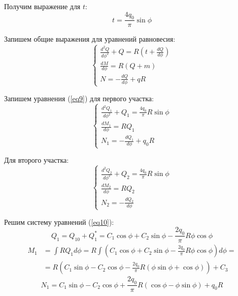 Получим выражение для $t$:
\begin{equation}
    \label{eq8}
    t = \frac{4q_0}{\pi} \sin \phi
\end{equation}

Запишем общие выражения для уравнений равновесия:
\begin{equation}
    \label{eq9}
    \begin{cases}
        \displaystyle \frac{d^2 Q}{d \phi^2} + Q = R(t + \frac{dQ}{d \phi})
        \\[10pt]
        \displaystyle \frac{dM}{d \phi} = R(Q + m)
        \\[10pt]
        \displaystyle N = -\frac{dQ}{d \phi} + qR
    \end{cases}
\end{equation}

Запишем уравнения (\ref{eq9}) для первого участка:
\begin{equation}
    \label{eq10}
    \begin{cases}
        \displaystyle \frac{d^2 Q_1}{d \phi^2} + Q_1 = \frac{4q_0}{\pi} R \sin \phi
        \\[10pt]
        \displaystyle \frac{dM_1}{d \phi} = RQ_1
        \\[10pt]
        \displaystyle N_1 = - \frac{dQ_1}{d \phi} + q_0R
    \end{cases}
\end{equation} 

Для второго участка:
\begin{equation}
    \label{eq11}
    \begin{cases}
        \displaystyle \frac{d^2Q_2}{d \phi^2} + Q_2 = \frac{4q_0}{\pi} R \sin \phi
        \\[10pt]
        \displaystyle \frac{dM_2}{d \phi} = RQ_2
        \\[10pt]
        \displaystyle N_2 = - \frac{dQ_2}{d \phi}
    \end{cases}
\end{equation}

Решим систему уравнений (\ref{eq10}):
\begin{equation}
    \label{eq12}
    Q_1 = Q_{10} + Q_1^* = C_1 \cos \phi + C_2 \sin \phi - \frac{2q_0}{\pi} R\phi \cos \phi
\end{equation}
\begin{equation}
    \label{eq13}
    \begin{split}
        M_1 & = \int{RQ_1 d \phi} = R \int{(C_1 \cos \phi + C_2 \sin \phi - \frac{2q_0}{\pi}R \phi \cos \phi) d \phi} =
        \\
        & = R (C_1 \sin \phi - C_2 \cos \phi - \frac{2q_0}{\pi}R (\phi \sin \phi + \cos \phi)) + C_3
    \end{split}
\end{equation}
\begin{equation}
    \label{eq14}
    N_1 = C_1 \sin \phi - C_2 \cos \phi + \frac{2q_0}{\pi} R (\cos \phi - \phi \sin \phi) + q_0R
\end{equation}

